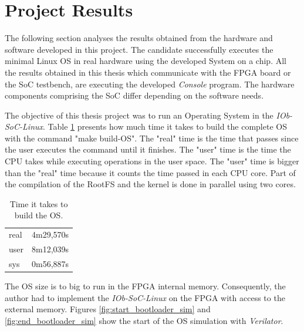 \section{Project Results}
\label{sec:project_results}
The following section analyses the results obtained from the hardware and software developed in this project. The candidate successfully executes the minimal Linux OS in real hardware using the developed System on a chip. All the results obtained in this thesis which communicate with the FPGA board or the SoC testbench, are executing the developed \textit{Console} program. The hardware components comprising the SoC differ depending on the software needs.

The objective of this thesis project was to run an Operating System in the \textit{IOb-SoC-Linux}. Table \ref{tab:time_os} presents how much time it takes to build the complete OS with the command "make build-OS". The "real" time is the time that passes since the user executes the command until it finishes. The "user" time is the time the CPU takes while executing operations in the user space. The "user" time is bigger than the "real" time because it counts the time passed in each CPU core. Part of the compilation of the RootFS and the kernel is done in parallel using two cores.

\begin{table}[!ht]
    \centering
    \begin{tabular}{ll}
    real & 4m29,570s \\
    user & 8m12,039s \\
    sys  & 0m56,887s
    \end{tabular}
    \caption{Time it takes to build the OS.}
    \label{tab:time_os}
\end{table}

The OS size is to big to run in the FPGA internal memory. Consequently, the author had to implement the \textit{IOb-SoC-Linux} on the FPGA with access to the external memory. Figures \ref{fig:start_bootloader_sim} and \ref{fig:end_bootloader_sim} show the start of the OS simulation with \textit{Verilator}.

